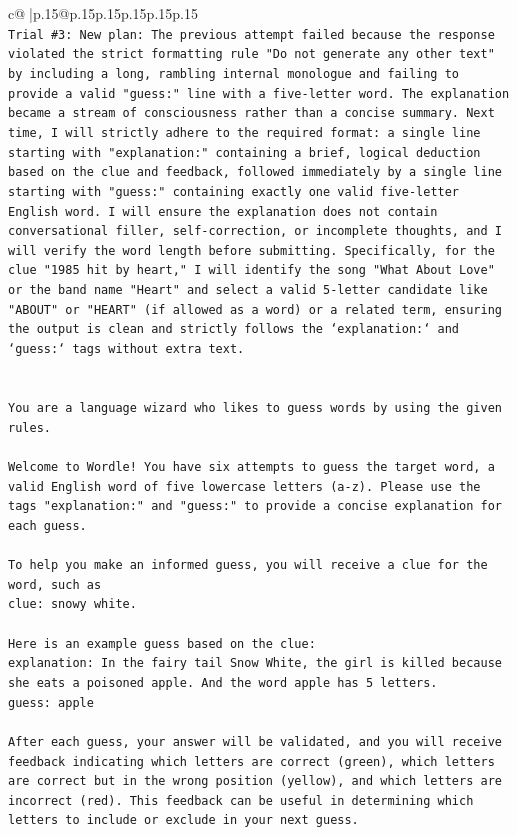 \documentclass{article}
\begin{document}
{\begin{supertabular}{c@{$\;$}|p{.15\linewidth}@{}p{.15\linewidth}p{.15\linewidth}p{.15\linewidth}p{.15\linewidth}p{.15\linewidth}}
{{{\\ 
\texttt{Trial \#3: New plan: The previous attempt failed because the response violated the strict formatting rule "Do not generate any other text" by including a long, rambling internal monologue and failing to provide a valid "guess:" line with a five{-}letter word. The explanation became a stream of consciousness rather than a concise summary. Next time, I will strictly adhere to the required format: a single line starting with "explanation:" containing a brief, logical deduction based on the clue and feedback, followed immediately by a single line starting with "guess:" containing exactly one valid five{-}letter English word. I will ensure the explanation does not contain conversational filler, self{-}correction, or incomplete thoughts, and I will verify the word length before submitting. Specifically, for the clue "1985 hit by heart," I will identify the song "What About Love" or the band name "Heart" and select a valid 5{-}letter candidate like "ABOUT" or "HEART" (if allowed as a word) or a related term, ensuring the output is clean and strictly follows the `explanation:` and `guess:` tags without extra text.} \\
\\ 
\\ 
\texttt{You are a language wizard who likes to guess words by using the given rules.} \\
\\ 
\texttt{Welcome to Wordle! You have six attempts to guess the target word, a valid English word of five lowercase letters (a{-}z). Please use the tags "explanation:" and "guess:" to provide a concise explanation for each guess.} \\
\\ 
\texttt{To help you make an informed guess, you will receive a clue for the word, such as} \\
\texttt{clue: snowy white.} \\
\\ 
\texttt{Here is an example guess based on the clue:} \\
\texttt{explanation: In the fairy tail Snow White, the girl is killed because she eats a poisoned apple. And the word apple has 5 letters.} \\
\texttt{guess: apple} \\
\\ 
\texttt{After each guess, your answer will be validated, and you will receive feedback indicating which letters are correct (green), which letters are correct but in the wrong position (yellow), and which letters are incorrect (red). This feedback can be useful in determining which letters to include or exclude in your next guess.} \\
}}}
\end{supertabular}}
\end{document}
